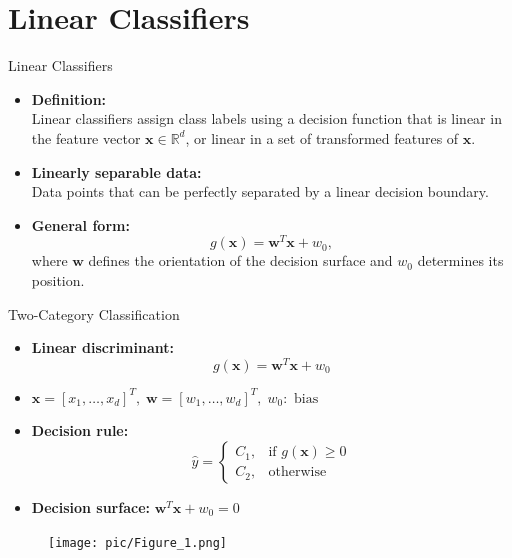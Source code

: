 \documentclass[serif, aspectratio=169]{beamer}
\begin{document}
    \section{Linear Classifiers}

    \begin{frame}{Linear Classifiers}
        \begin{itemize}\itemsep1.5em
        \item \justifying \textbf{Definition:}\\
        Linear classifiers assign class labels using a decision function that is linear in the feature vector $\mathbf{x} \in \mathbb{R}^d$, or linear in a set of transformed features of $\mathbf{x}$.
        \item \justifying \textbf{Linearly separable data:}\\
        Data points that can be perfectly separated by a linear decision boundary.
        \item \textbf{General form:}
        \[
            g(\mathbf{x}) = \mathbf{w}^T \mathbf{x} + w_0,
        \]
        where $\mathbf{w}$ defines the orientation of the decision surface and $w_0$ determines its position.
        \end{itemize}
    \end{frame}


    \begin{frame}{Two-Category Classification}
        \begin{itemize}\itemsep1.2em
        \item \textbf{Linear discriminant:}
        \[
            g(\mathbf{x}) = \mathbf{w}^T\mathbf{x} + w_0
        \]
        \item \(\mathbf{x} = [x_1, \dots, x_d]^T,\; \mathbf{w} = [w_1, \dots, w_d]^T,\; w_0:\text{ bias}\)
        \item \textbf{Decision rule:}
        \[
            \hat{y} =
            \begin{cases}
                C_1, & \text{if } g(\mathbf{x}) \ge 0 \\
                C_2, & \text{otherwise}
            \end{cases}
        \]
        \item \textbf{Decision surface:} $\mathbf{w}^T\mathbf{x} + w_0 = 0$
        \end{itemize}
        \endminipage
        \hfill
        \begin{figure}[bh]
            \texttt{[image: pic/Figure\_1.png]}
        \end{figure}
        \endminipage
    \end{frame}
\end{document}
